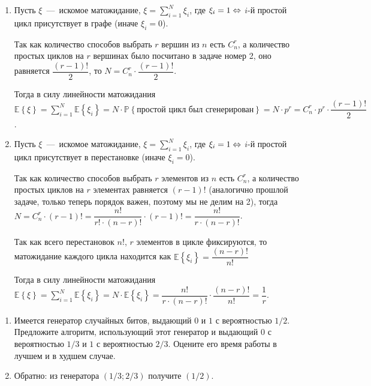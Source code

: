 \documentclass[a4paper,12pt]{article}
\newcommand{\prob}[1]{\mathbb{P}\left\{#1\right\}}
\newcommand{\expected}[1]{\mathbb{E}\left\{#1\right\}}
\begin{document}
\begin{solution}
	\begin{enumerate}
		\item Пусть $\xi$~---~искомое матожидание, $\xi = \displaystyle\sum_{i=1}^N \xi_i$, где $\xi_i = 1 \Leftrightarrow$ $i$-й простой цикл присутствует в графе (иначе $\xi_i = 0$).
		
		Так как количество способов выбрать $r$ вершин из $n$ есть $C_n^r$, а количество простых циклов на $r$ вершинах было посчитано в задаче номер 2, оно равняется $\dfrac{(r-1)!}{2}$, то $N = C_n^r \cdot \dfrac{(r-1)!}{2}$.
		
		Тогда в силу линейности матожидания $\expected{\xi} = \displaystyle\sum_{i=1}^N \expected{\xi_i} = N \cdot \prob{\text{простой цикл был сгенерирован}} = N \cdot p^r = C_n^r \cdot p^r \cdot \dfrac{(r-1)!}{2}$.
		
		\item  Пусть $\xi$~---~искомое матожидание, $\xi = \displaystyle\sum_{i=1}^N \xi_i$, где $\xi_i = 1 \Leftrightarrow$ $i$-й простой цикл присутствует в перестановке (иначе $\xi_i = 0$).
		
		Так как количество способов выбрать $r$ элементов из $n$ есть $C_n^r$, 
		а количество простых циклов на $r$ элементах равняется $(r-1)!$ (аналогично прошлой задаче, только теперь порядок важен, поэтому мы не делим на 2), тогда $N = C_n^r \cdot (r-1)! = \dfrac{n!}{r! \cdot (n-r)!} \cdot (r-1)! = \dfrac{n!}{r \cdot (n-r)!}$.
		
		Так как всего перестановок $n!$, $r$ элементов в цикле фиксируются, то матожидание каждого цикла находится как $\expected{\xi_i} = \dfrac{(n-r)!}{n!}$
		
		Тогда в силу линейности матожидания $\expected{\xi} = \displaystyle\sum_{i=1}^N \expected{\xi_i} = N \cdot \expected{\xi_i} = \dfrac{n!}{r \cdot (n-r)!} \cdot \dfrac{(n-r)!}{n!} = \dfrac{1}{r}$.
	\end{enumerate}
\end{solution}

\vspace{5mm}

\begin{tasknum}{6}
	\begin{enumerate}
		\item Имеется генератор случайных битов, выдающий $0$ и $1$ с вероятностью $1/2$. Предложите алгоритм, использующий этот генератор и выдающий $0$ с вероятностью $1/3$ и $1$ с вероятностью $2/3$. Оцените его время работы в лучшем и в худшем случае.
		
		\item Обратно: из генератора $(1/3; 2/3)$ получите $(1/2)$.
	\end{enumerate}
\end{tasknum}
\end{document}
